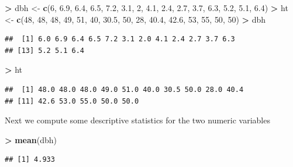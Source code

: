 \documentclass[]{krantz}
\makeatletter
\newenvironment{Shaded}{\begin{snugshade}}{\end{snugshade}}
\newcommand{\KeywordTok}[1]{\textcolor[rgb]{0.27,0.27,0.27}{\textbf{#1}}}
\newcommand{\DecValTok}[1]{\textcolor[rgb]{0.06,0.06,0.06}{#1}}
\newcommand{\FloatTok}[1]{\textcolor[rgb]{0.06,0.06,0.06}{#1}}
\newcommand{\StringTok}[1]{\textcolor[rgb]{0.5,0.5,0.5}{#1}}
\newcommand{\OperatorTok}[1]{\textcolor[rgb]{0.43,0.43,0.43}{\textbf{#1}}}
\newcommand{\NormalTok}[1]{#1}
\newenvironment{kframe}{%
\medskip{}
\setlength{\fboxsep}{.8em}
 \def\at@end@of@kframe{}%
 \ifinner\ifhmode%
  \def\at@end@of@kframe{\end{minipage}}%
  \begin{minipage}{\columnwidth}%
 \fi\fi%
 \def\FrameCommand##1{\hskip\@totalleftmargin \hskip-\fboxsep
 \colorbox{shadecolor}{##1}\hskip-\fboxsep
     \hskip-\linewidth \hskip-\@totalleftmargin \hskip\columnwidth}%
 \MakeFramed {\advance\hsize-\width
   \@totalleftmargin\z@ \linewidth\hsize
   \@setminipage}}%
 {\par\unskip\endMakeFramed%
 \at@end@of@kframe}
\renewenvironment{Shaded}{\begin{kframe}}{\end{kframe}}
\theoremstyle{definition}
\theoremstyle{definition}
\theoremstyle{definition}
\theoremstyle{remark}
\makeatother
\begin{document}
\begin{Shaded}
\begin{Highlighting}[]
\OperatorTok{>}\StringTok{ }\NormalTok{dbh <-}\StringTok{ }\KeywordTok{c}\NormalTok{(}\DecValTok{6}\NormalTok{, }\FloatTok{6.9}\NormalTok{, }\FloatTok{6.4}\NormalTok{, }\FloatTok{6.5}\NormalTok{, }\FloatTok{7.2}\NormalTok{, }\FloatTok{3.1}\NormalTok{, }\DecValTok{2}\NormalTok{, }\FloatTok{4.1}\NormalTok{, }\FloatTok{2.4}\NormalTok{, }\FloatTok{2.7}\NormalTok{, }\FloatTok{3.7}\NormalTok{, }\FloatTok{6.3}\NormalTok{, }\FloatTok{5.2}\NormalTok{, }\FloatTok{5.1}\NormalTok{, }\FloatTok{6.4}\NormalTok{)}
\OperatorTok{>}\StringTok{ }\NormalTok{ht <-}\StringTok{ }\KeywordTok{c}\NormalTok{(}\DecValTok{48}\NormalTok{, }\DecValTok{48}\NormalTok{, }\DecValTok{48}\NormalTok{, }\DecValTok{49}\NormalTok{, }\DecValTok{51}\NormalTok{, }\DecValTok{40}\NormalTok{, }\FloatTok{30.5}\NormalTok{, }\DecValTok{50}\NormalTok{, }\DecValTok{28}\NormalTok{, }\FloatTok{40.4}\NormalTok{, }\FloatTok{42.6}\NormalTok{, }\DecValTok{53}\NormalTok{, }\DecValTok{55}\NormalTok{, }\DecValTok{50}\NormalTok{, }\DecValTok{50}\NormalTok{)}
\OperatorTok{>}\StringTok{ }\NormalTok{dbh}
\end{Highlighting}
\end{Shaded}

\begin{verbatim}
##  [1] 6.0 6.9 6.4 6.5 7.2 3.1 2.0 4.1 2.4 2.7 3.7 6.3
## [13] 5.2 5.1 6.4
\end{verbatim}

\begin{Shaded}
\begin{Highlighting}[]
\OperatorTok{>}\StringTok{ }\NormalTok{ht}
\end{Highlighting}
\end{Shaded}

\begin{verbatim}
##  [1] 48.0 48.0 48.0 49.0 51.0 40.0 30.5 50.0 28.0 40.4
## [11] 42.6 53.0 55.0 50.0 50.0
\end{verbatim}

Next we compute some descriptive statistics for the two numeric
variables

\begin{Shaded}
\begin{Highlighting}[]
\OperatorTok{>}\StringTok{ }\KeywordTok{mean}\NormalTok{(dbh)}
\end{Highlighting}
\end{Shaded}

\begin{verbatim}
## [1] 4.933
\end{verbatim}
\end{document}
